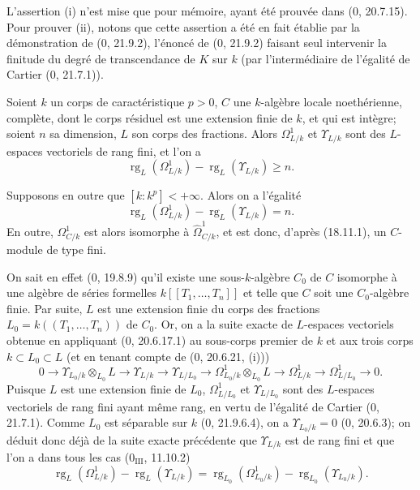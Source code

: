 L'assertion (i) n'est mise que pour mémoire, ayant été prouvée dans (0, 20.7.15). Pour prouver (ii), notons que cette assertion a été en fait établie par la démonstration de (0, 21.9.2), l'énoncé de (0, 21.9.2) faisant seul intervenir la finitude du degré de transcendance de $K$ sur $k$ (par l'intermédiaire de l'égalité de Cartier (0, 21.7.1)).

\begin{lemma}[18.11.2]
\label{IV.18.11.2}
Soient $k$ un corps de caractéristique $p>0$, $C$ une $k$-algèbre locale noethérienne, complète, dont le corps résiduel est une extension finie de $k$, et qui est intègre; soient $n$ sa dimension, $L$ son corps des fractions. Alors $\Omega^1_{L/k}$ et $\Upsilon_{L/k}$ sont des $L$-espaces vectoriels de rang fini, et l'on a
\begin{equation}
\label{IV.18.11.2.1}
\tag{18.11.2.1}
  \operatorname{rg}_L(\Omega^1_{L/k})-\operatorname{rg}_L(\Upsilon_{L/k})\geq n.
\end{equation}


Supposons en outre que $[k:k^p]<+\infty$. Alors on a l'égalité
\begin{equation}
\label{IV.18.11.2.2}
\tag{18.11.2.2}
  \operatorname{rg}_L(\Omega^1_{L/k})-\operatorname{rg}_L(\Upsilon_{L/k})=n.
\end{equation}
En outre, $\Omega^1_{C/k}$ est alors isomorphe à $\hat{\Omega}^1_{C/k}$, et est donc, d'après (18.11.1), un $C$-module de type fini.
\end{lemma}

On sait en effet (0, 19.8.9) qu'il existe une sous-$k$-algèbre $C_0$ de $C$ isomorphe à une algèbre de séries formelles $k[[T_1,\ldots,T_n]]$ et telle que $C$ soit une $C_0$-algèbre finie. Par suite, $L$ est une extension finie du corps des fractions $L_0=k((T_1,\ldots,T_n))$ de $C_0$. Or, on a la suite exacte de $L$-espaces vectoriels obtenue en appliquant (0, 20.6.17.1) au sous-corps premier de $k$ et aux trois corps $k\subset L_0\subset L$ (et en tenant compte de (0, 20.6.21, (i)))
\[
  0\to\Upsilon_{L_0/k}\otimes_{L_0}L\to\Upsilon_{L/k}\to\Upsilon_{L/L_0}
  \to\Omega^1_{L_0/k}\otimes_{L_0}L\to\Omega^1_{L/k}\to\Omega^1_{L/L_0}\to0.
\]
Puisque $L$ est une extension finie de $L_0$, $\Omega^1_{L/L_0}$ et $\Upsilon_{L/L_0}$ sont des $L$-espaces vectoriels de rang fini ayant même rang, en vertu de l'égalité de Cartier (0, 21.7.1). Comme $L_0$ est séparable sur $k$ (0, 21.9.6.4), on a $\Upsilon_{L_0/k}=0$ (0, 20.6.3); on déduit donc déjà de la suite exacte précédente que $\Upsilon_{L/k}$ est de rang fini et que l'on a dans tous les cas ($0_{\mathrm{III}}$, 11.10.2)
\[
  \operatorname{rg}_L(\Omega^1_{L/k})-\operatorname{rg}_L(\Upsilon_{L/k})
  =\operatorname{rg}_{L_0}(\Omega^1_{L_0/k})-\operatorname{rg}_{L_0}(\Upsilon_{L_0/k}).
\]


